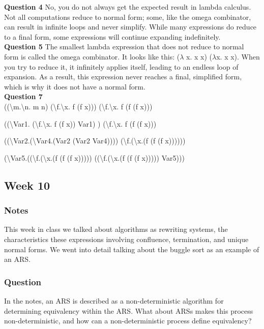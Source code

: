 \documentclass{article}
\theoremstyle{theorem}
\theoremstyle{definition}
\theoremstyle{remark}
\begin{document}
\textbf{Question 4}
No, you do not always get the expected result in lambda calculus. Not all computations reduce to normal form; some, like the omega combinator, can result in infinite loops and never simplify. While many expressions do reduce to a final form, some expressions will continue expanding indefinitely.\\

\textbf{Question 5}
The smallest lambda expression that does not reduce to normal form is called the omega combinator. It looks like this: ($\lambda$ x. x x) ($\lambda$x. x x). When you try to reduce it, it infinitely applies itself, leading to an endless loop of expansion. As a result, this expression never reaches a final, simplified form, which is why it does not have a normal form.\\

\textbf{Question 7}\\
((\textbackslash m.\textbackslash n. m n) (\textbackslash f.\textbackslash x. f (f x))) (\textbackslash f.\textbackslash x. f (f (f x)))

((\textbackslash Var1. (\textbackslash f.\textbackslash x. f (f x)) Var1) ) (\textbackslash f.\textbackslash x. f (f (f x)))

((\textbackslash Var2.(\textbackslash Var4.(Var2 (Var2 Var4)))) (\textbackslash f.(\textbackslash x.(f (f (f x))))))

(\textbackslash Var5.((\textbackslash f.(\textbackslash x.(f (f (f x))))) ((\textbackslash f.(\textbackslash x.(f (f (f x))))) Var5)))

\subsection{Week 10}

\subsubsection*{Notes} This week in class we talked about algorithms as rewriting systems, the characteristics these expressions involving confluence, termination, and unique normal forms. We went into detail talking about the buggle sort as an example of an ARS. 

\subsubsection*{Question} In the notes, an ARS is described as a non-deterministic algorithm for determining equivalency within the ARS. What about ARSs makes this process non-deterministic, and how can a non-deterministic process define equivalency?
\end{document}
